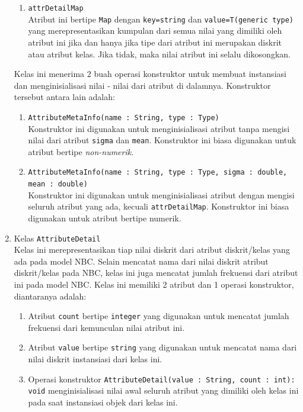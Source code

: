 \begin{enumerate}
\begin{enumerate}
		\item{\texttt{attrDetailMap}}\\
		Atribut ini bertipe \texttt{Map} dengan \texttt{key=string} dan \texttt{value=T(generic type)} yang merepresentasikan kumpulan dari semua nilai yang dimiliki oleh atribut ini jika dan hanya jika tipe dari atribut ini merupakan diskrit atau atribut kelas. Jika tidak, maka nilai atribut ini selalu dikosongkan.
	\end{enumerate}
	
	Kelas ini menerima 2 buah operasi konstruktor untuk membuat instansiasi dan menginisialisasi nilai - nilai dari atribut di dalamnya. Konstruktor tersebut antara lain adalah:
	\begin{enumerate}
		\item \texttt{AttributeMetaInfo(name : String, type : Type)}\\
		Konstruktor ini digunakan untuk menginisialisasi atribut tanpa mengisi nilai dari atribut \texttt{sigma} dan \texttt{mean}. Konstruktor ini biasa digunakan untuk atribut bertipe \textit{non-numerik}.
		\item \texttt{AttributeMetaInfo(name : String, type : Type, sigma : double, mean : double)}\\
		Konstruktor ini digunakan untuk menginisialisasi atribut dengan mengisi seluruh atribut yang ada, kecuali \texttt{attrDetailMap}. Konstruktor ini biasa digunakan untuk atribut bertipe numerik.
		
	\end{enumerate}
	
	\item{Kelas \texttt{AttributeDetail}}\\
	Kelas ini merepresentasikan tiap nilai diskrit dari atribut diskrit/kelas yang ada pada model NBC. Selain mencatat nama dari nilai diskrit atribut diskrit/kelas pada NBC, kelas ini juga mencatat jumlah frekuensi dari atribut ini pada model NBC.
	Kelas ini memiliki 2 atribut dan 1 operasi konstruktor, diantaranya adalah:
	\begin{enumerate}
		\item Atribut \texttt{count} bertipe \texttt{integer} yang digunakan untuk mencatat jumlah frekuensi dari kemunculan nilai atribut ini.
		\item Atribut \texttt{value} bertipe \texttt{string} yang digunakan untuk mencatat nama dari nilai diskrit instansiasi dari kelas ini.
		\item Operasi konstruktor \texttt{AttributeDetail(value : String, count : int): void} menginisialisasi nilai awal seluruh atribut yang dimiliki oleh kelas ini pada saat instansiasi objek dari kelas ini.
	\end{enumerate} 
	
\end{enumerate}

